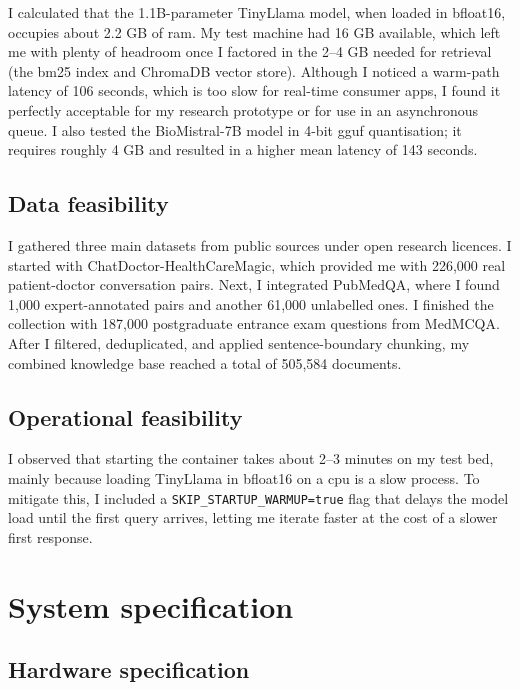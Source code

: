 I calculated that the 1.1B-parameter TinyLlama model, when loaded in bfloat16, occupies about 2.2 GB of \ac{ram}. My test machine had 16 GB available, which left me with plenty of headroom once I factored in the 2--4 GB needed for retrieval (the \ac{bm25} index and ChromaDB vector store). Although I noticed a warm-path latency of 106 seconds, which is too slow for real-time consumer apps, I found it perfectly acceptable for my research prototype or for use in an asynchronous queue. I also tested the BioMistral-7B model in 4-bit \ac{gguf} quantisation; it requires roughly 4 GB and resulted in a higher mean latency of 143 seconds.

\subsection{Data feasibility}

I gathered three main datasets from public sources under open research licences. I started with ChatDoctor-HealthCareMagic, which provided me with 226,000 real patient-doctor conversation pairs. Next, I integrated PubMedQA, where I found 1,000 expert-annotated pairs and another 61,000 unlabelled ones. I finished the collection with 187,000 postgraduate entrance exam questions from MedMCQA. After I filtered, deduplicated, and applied sentence-boundary chunking, my combined knowledge base reached a total of 505,584 documents.

\subsection{Operational feasibility}

I observed that starting the container takes about 2--3 minutes on my test bed, mainly because loading TinyLlama in bfloat16 on a \ac{cpu} is a slow process. To mitigate this, I included a \texttt{SKIP\_STARTUP\_WARMUP=true} flag that delays the model load until the first query arrives, letting me iterate faster at the cost of a slower first response.

\section{System specification}

\subsection{Hardware specification}

